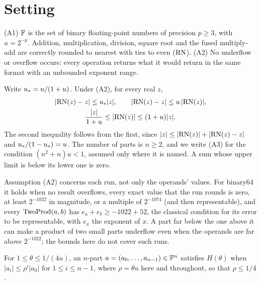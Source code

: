 \section{Setting}

\begin{assumption}\label{as:fp}
(A1) $\mathbb{F}$ is the set of binary floating-point numbers of precision $p \ge 3$, with $u = 2^{-p}$. Addition,
multiplication, division, square root and the fused multiply-add are correctly rounded to nearest with ties to even
($\mathrm{RN}$). (A2) No underflow or overflow occurs: every operation returns
what it would return in the same format with an unbounded exponent range.
\end{assumption}

Write $u_{*} = u/(1+u)$. Under (A2), for every real $z$,
\begin{gather}
|\mathrm{RN}(z) - z| \le u_{*} |z|, \qquad |\mathrm{RN}(z) - z| \le u\,|\mathrm{RN}(z)|, \label{eq:rn} \\
\frac{|z|}{1+u} \le |\mathrm{RN}(z)| \le (1+u)|z|. \nonumber
\end{gather}
The second inequality follows from the first, since $|z| \le |\mathrm{RN}(z)| + |\mathrm{RN}(z) - z|$ and $u_{*}/(1-u_{*}) = u$. The
number of parts is $n \ge 2$, and we write (A3) for the condition $(n^2+n)u < 1$, assumed only where it is named. A sum
whose upper limit is below its lower one is zero.

Assumption (A2) concerns each run, not only the operands' values. For binary64 it holds when no result overflows,
every exact value that the run rounds is zero, at least $2^{-1022}$ in magnitude, or a multiple of $2^{-1074}$ (and
then representable), and every $\mathrm{TwoProd}(a, b)$ has $e_a + e_b \ge -1022 + 52$, the classical condition for its
error to be representable, with $e_x$ the exponent of $x$. A part far below the one above it can make a product of
two small parts underflow even when the operands are far above $2^{-1022}$; the bounds here do not cover such runs.

\begin{definition}\label{def:h}
For $1 \le \theta \le 1/(4u)$, an $n$-part $a = (a_0, \dots, a_{n-1}) \in \mathbb{F}^n$ satisfies $H(\theta)$ when $|a_i| \le
\rho^i |a_0|$ for $1 \le i \le n-1$, where $\rho = \theta u$ here and throughout, so that $\rho \le 1/4$.
\end{definition}

